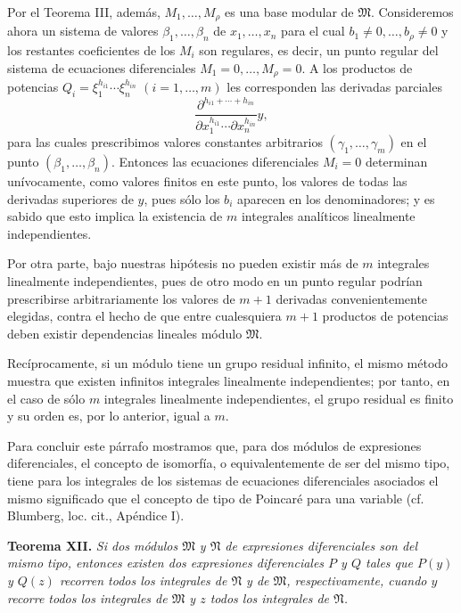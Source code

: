 Por el Teorema III, además, $M_1,\ldots,M_\rho$ es una base modular de $\mathfrak M$. Consideremos ahora un sistema de valores $\beta_1,\ldots,\beta_n$ de $x_1,\ldots,x_n$ para el cual $b_1\ne0,\ldots,b_\rho\ne0$ y los restantes coeficientes de los $M_i$ son regulares, es decir, un punto regular del sistema de ecuaciones diferenciales $M_1=0,\ldots,M_\rho=0$. A los productos de potencias $Q_i=\xi_1^{h_{i1}}\cdots\xi_n^{h_{in}}$ $(i=1,\ldots,m)$ les corresponden las derivadas parciales
\[
 \frac{\partial^{h_{i1}+\cdots+h_{in}}}{\partial x_1^{h_{i1}}\cdots\partial x_n^{h_{in}}}y,
\]
para las cuales prescribimos valores constantes arbitrarios $(\gamma_1,\ldots,\gamma_m)$ en el punto $(\beta_1,\ldots,\beta_n)$. Entonces las ecuaciones diferenciales $M_i=0$ determinan unívocamente, como valores finitos en este punto, los valores de todas las derivadas superiores de $y$, pues sólo los $b_i$ aparecen en los denominadores; y es sabido que esto implica la existencia de $m$ integrales analíticos linealmente independientes.

Por otra parte, bajo nuestras hipótesis no pueden existir más de $m$ integrales linealmente independientes, pues de otro modo en un punto regular podrían prescribirse arbitrariamente los valores de $m+1$ derivadas convenientemente elegidas, contra el hecho de que entre cualesquiera $m+1$ productos de potencias deben existir dependencias lineales módulo $\mathfrak M$.

Recíprocamente, si un módulo tiene un grupo residual infinito, el mismo método muestra que existen infinitos integrales linealmente independientes; por tanto, en el caso de sólo $m$ integrales linealmente independientes, el grupo residual es finito y su orden es, por lo anterior, igual a $m$.

Para concluir este párrafo mostramos que, para dos módulos de expresiones diferenciales, el concepto de isomorfía, o equivalentemente de ser del mismo tipo, tiene para los integrales de los sistemas de ecuaciones diferenciales asociados el mismo significado que el concepto de tipo de Poincaré para una variable (cf. Blumberg, loc. cit., Apéndice I).

\textbf{Teorema XII.} \emph{Si dos módulos $\mathfrak M$ y $\mathfrak N$ de expresiones diferenciales son del mismo tipo, entonces existen dos expresiones diferenciales $P$ y $Q$ tales que $P(y)$ y $Q(z)$ recorren todos los integrales de $\mathfrak N$ y de $\mathfrak M$, respectivamente, cuando $y$ recorre todos los integrales de $\mathfrak M$ y $z$ todos los integrales de $\mathfrak N$.}

